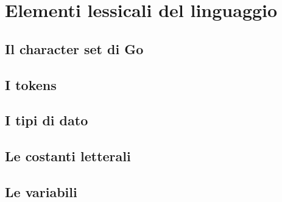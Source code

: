 \chapter{Elementi lessicali del linguaggio}
\section{Il character set di Go}
\section{I tokens}
\section{I tipi di dato}
\section{Le costanti letterali}
\section*{Le variabili}
